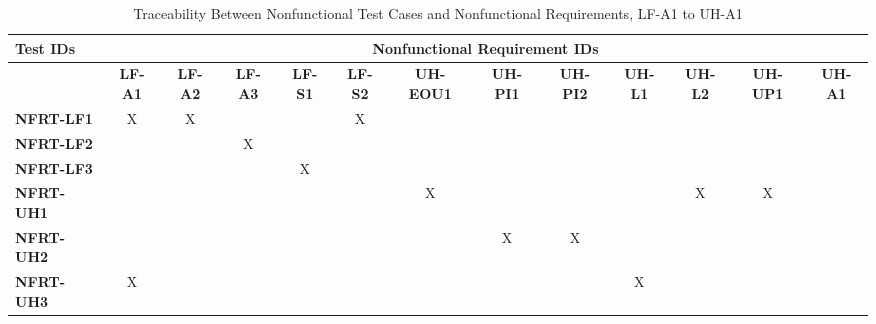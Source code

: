 \documentclass[12pt, titlepage]{article}
\begin{document}
\begin{landscape}
		\begin{longtable}{|l|cccccccccccc|}
	\caption{Traceability Between Nonfunctional Test Cases and Nonfunctional Requirements, LF-A1 to UH-A1}                                                                                                                                                                                                                           \\
		\hline
		\textbf{Test IDs}   & \multicolumn{12}{c|}{\textbf{Nonfunctional Requirement IDs}}                                                                                                                                                                                                                 \\
		\hline
		~                   & \textbf{LF-A1}  & \textbf{LF-A2} & \textbf{LF-A3} & \textbf{LF-S1} & \textbf{LF-S2} & \textbf{UH-EOU1} & \textbf{UH-PI1} & \textbf{UH-PI2} & \textbf{UH-L1} & \textbf{UH-L2} & \textbf{UH-UP1} & \textbf{UH-A1} \\
		\hline
		\textbf{NFRT-LF1} & X                                                         & X             & ~             & ~             & X             & ~             & ~             & ~             & ~             & ~             & ~             & ~ \\
		\textbf{NFRT-LF2} & ~                                                         & ~             & X             & ~             & ~             & ~             & ~             & ~             & ~             & ~             & ~             & ~ \\
		\textbf{NFRT-LF3} & ~                                                         & ~             & ~             & X             & ~             & ~             & ~             & ~             & ~             & ~             & ~             & ~ \\
		\textbf{NFRT-UH1} & ~                                                         & ~             & ~             & ~             & ~             & X             & ~             & ~             & ~             & X             & X             & ~ \\
		\textbf{NFRT-UH2} & ~                                                         & ~             & ~             & ~             & ~             & ~             & X             & X             & ~             & ~             & ~             & ~ \\
		\textbf{NFRT-UH3} & X                                                         & ~             & ~             & ~             & ~             & ~             & ~             & ~             & X             & ~             & ~             & ~ \\
		\hline
	\end{longtable}


\end{landscape}
\end{document}
